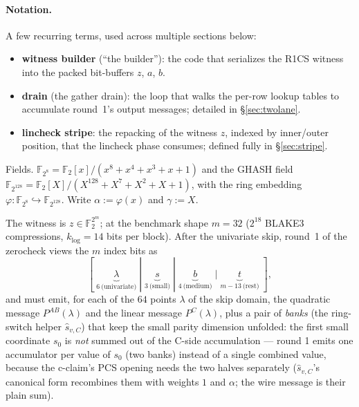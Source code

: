 \documentclass[11pt]{article}
\newcommand{\Ftwo}{\mathbb{F}_2}
\newcommand{\Feight}{\mathbb{F}_{2^8}}
\newcommand{\Fbig}{\mathbb{F}_{2^{128}}}
\begin{document}
\paragraph{Notation.}
A few recurring terms, used across multiple sections below:
\begin{itemize}
\setlength{\itemsep}{1pt}
\item \textbf{witness builder} (``the builder''): the code that serializes
  the R1CS witness into the packed bit-buffers $z$, $a$, $b$.
\item \textbf{drain} (the gather drain): the loop that walks the per-row
  lookup tables to accumulate round~1's output messages; detailed in
  \S\ref{sec:twolane}.
\item \textbf{lincheck stripe}: the repacking of the witness $z$, indexed
  by inner/outer position, that the lincheck phase consumes; defined
  fully in \S\ref{sec:stripe}.
\end{itemize}


Fields. $\Feight = \Ftwo[x]/(x^8+x^4+x^3+x+1)$ and the GHASH field
$\Fbig = \Ftwo[X]/(X^{128}+X^7+X^2+X+1)$, with the ring embedding
$\varphi:\Feight\hookrightarrow\Fbig$. Write $\alpha := \varphi(x)$ and
$\gamma := X$.

The witness is $z\in\Ftwo^{2^m}$; at the benchmark shape $m=32$
($2^{18}$ BLAKE3 compressions, $k_{\log}=14$ bits per block). After the
univariate skip, round~1 of the zerocheck views the $m$ index bits as
\[
[\;\underbrace{\lambda}_{6\ \text{(univariate)}}\;|\;
 \underbrace{s}_{3\ \text{(small)}}\;|\;
 \underbrace{b}_{4\ \text{(medium)}}\;|\;
 \underbrace{t}_{m-13\ \text{(rest)}}\;],
\]
and must emit, for each of the $64$ points $\lambda$ of the skip domain, the
quadratic message $P^{AB}(\lambda)$ and the linear message $P^{C}(\lambda)$,
plus a pair of \emph{banks} (the ring-switch helper $\hat s_{v,C}$) that keep
the small parity dimension unfolded: the first small coordinate $s_0$ is
\emph{not} summed out of the C-side accumulation --- round 1 emits one
accumulator per value of $s_0$ (two banks) instead of a single combined
value, because the c-claim's PCS opening needs the two halves separately
($\hat s_{v,C}$'s canonical form recombines them with weights $1$ and
$\alpha$; the wire message is their plain sum).
\end{document}
